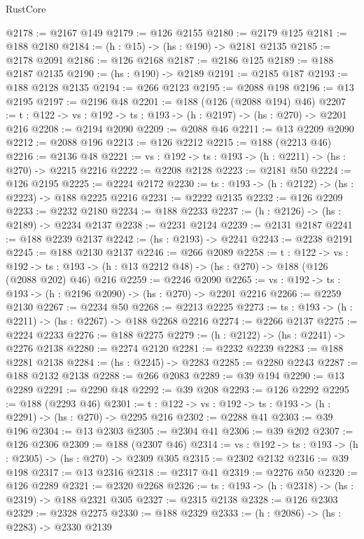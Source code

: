 \begin{lexlean}{RustCore}
\begin{coremodule}
@2178 := @2167 @149
@2179 := @126 @2155
@2180 := @2179 @125
@2181 := @188 @2180
@2184 := (h : @15) -> (hs : @190) -> @2181 @2135
@2185 := @2178 @2091
@2186 := @126 @2168
@2187 := @2186 @125
@2189 := @188 @2187 @2135
@2190 := (hs : @190) -> @2189
@2191 := @2185 @187
@2193 := @188 @2128 @2135
@2194 := @266 @2123
@2195 := @2088 @198
@2196 := @13 @2195
@2197 := @2196 @48
@2201 := @188 (@126 (@2088 @194) @46)
@2207 := {t : @122} -> {vs : @192} -> {ts : @193} -> (h : @2197) -> (hs : @270) -> @2201 @216
@2208 := @2194 @2090
@2209 := @2088 @46
@2211 := @13 @2209 @2090
@2212 := @2088 @196
@2213 := @126 @2212
@2215 := @188 (@2213 @46)
@2216 := @2136 @48
@2221 := {vs : @192} -> {ts : @193} -> (h : @2211) -> (hs : @270) -> @2215 @2216
@2222 := @2208 @2128
@2223 := @2181 @50
@2224 := @126 @2195
@2225 := @2224 @2172
@2230 := {ts : @193} -> (h : @2122) -> (hs : @2223) -> @188 @2225 @2216
@2231 := @2222 @2135
@2232 := @126 @2209
@2233 := @2232 @2180
@2234 := @188 @2233
@2237 := (h : @2126) -> (hs : @2189) -> @2234 @2137
@2238 := @2231 @2124
@2239 := @2131 @2187
@2241 := @188 @2239 @2137
@2242 := (hs : @2193) -> @2241
@2243 := @2238 @2191
@2245 := @188 @2130 @2137
@2246 := @266 @2089
@2258 := {t : @122} ->
  {vs : @192} ->
  {ts : @193} -> (h : @13 @2212 @48) -> (hs : @270) -> @188 (@126 (@2088 @202) @46) @216
@2259 := @2246 @2090
@2265 := {vs : @192} -> {ts : @193} -> (h : @2196 @2090) -> (hs : @270) -> @2201 @2216
@2266 := @2259 @2130
@2267 := @2234 @50
@2268 := @2213 @2225
@2273 := {ts : @193} -> (h : @2211) -> (hs : @2267) -> @188 @2268 @2216
@2274 := @2266 @2137
@2275 := @2224 @2233
@2276 := @188 @2275
@2279 := (h : @2122) -> (hs : @2241) -> @2276 @2138
@2280 := @2274 @2120
@2281 := @2232 @2239
@2283 := @188 @2281 @2138
@2284 := (hs : @2245) -> @2283
@2285 := @2280 @2243
@2287 := @188 @2132 @2138
@2288 := @266 @2083
@2289 := @39 @194
@2290 := @13 @2289
@2291 := @2290 @48
@2292 := @39 @208
@2293 := @126 @2292
@2295 := @188 (@2293 @46)
@2301 := {t : @122} -> {vs : @192} -> {ts : @193} -> (h : @2291) -> (hs : @270) -> @2295 @216
@2302 := @2288 @41
@2303 := @39 @196
@2304 := @13 @2303
@2305 := @2304 @41
@2306 := @39 @202
@2307 := @126 @2306
@2309 := @188 (@2307 @46)
@2314 := {vs : @192} -> {ts : @193} -> (h : @2305) -> (hs : @270) -> @2309 @305
@2315 := @2302 @2132
@2316 := @39 @198
@2317 := @13 @2316
@2318 := @2317 @41
@2319 := @2276 @50
@2320 := @126 @2289
@2321 := @2320 @2268
@2326 := {ts : @193} -> (h : @2318) -> (hs : @2319) -> @188 @2321 @305
@2327 := @2315 @2138
@2328 := @126 @2303
@2329 := @2328 @2275
@2330 := @188 @2329
@2333 := (h : @2086) -> (hs : @2283) -> @2330 @2139

\end{coremodule}
\end{lexlean}
